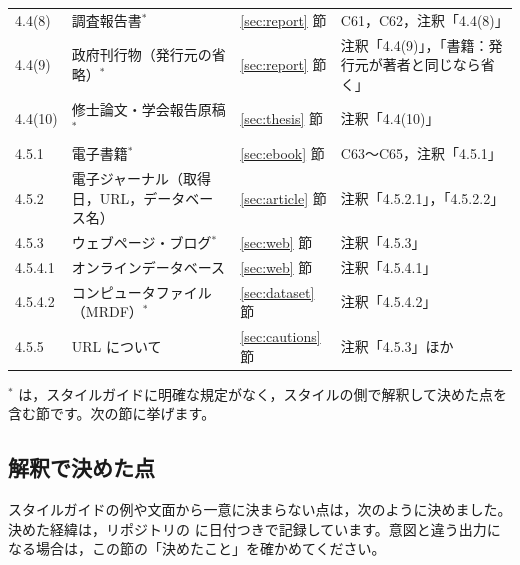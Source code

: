 \begin{longtable}{@{}L{.11\textwidth}L{.31\textwidth}L{.17\textwidth}L{.26\textwidth}@{}}
4.4(8) & 調査報告書$^{*}$ & \ref{sec:report} 節 & C61，C62，注釈「4.4(8)」 \\
4.4(9) & 政府刊行物（発行元の省略）$^{*}$ & \ref{sec:report} 節 & 注釈「4.4(9)」，「書籍：発行元が著者と同じなら省く」 \\
4.4(10) & 修士論文・学会報告原稿$^{*}$ & \ref{sec:thesis} 節 & 注釈「4.4(10)」 \\
4.5.1 & 電子書籍$^{*}$ & \ref{sec:ebook} 節 & C63〜C65，注釈「4.5.1」 \\
4.5.2 & 電子ジャーナル（取得日，URL，データベース名） & \ref{sec:article} 節 & 注釈「4.5.2.1」，「4.5.2.2」 \\
4.5.3 & ウェブページ・ブログ$^{*}$ & \ref{sec:web} 節 & 注釈「4.5.3」 \\
4.5.4.1 & オンラインデータベース & \ref{sec:web} 節 & 注釈「4.5.4.1」 \\
4.5.4.2 & コンピュータファイル（MRDF）$^{*}$ & \ref{sec:dataset} 節 & 注釈「4.5.4.2」 \\
4.5.5 & URL について & \ref{sec:cautions} 節 & 注釈「4.5.3」ほか \\
\end{longtable}
\endgroup

$^{*}$ は，スタイルガイドに明確な規定がなく，スタイルの側で解釈して決めた点を含む節です。次の節に挙げます。

\subsection{解釈で決めた点}
スタイルガイドの例や文面から一意に決まらない点は，次のように決めました。決めた経緯は，リポジトリの  に日付つきで記録しています。意図と違う出力になる場合は，この節の「決めたこと」を確かめてください。


